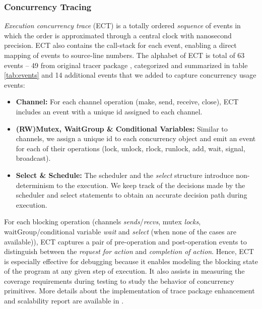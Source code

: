 \subsubsection{Concurrency Tracing}
\textit{Execution concurrency trace} (ECT) is a totally ordered \textit{sequence} of events in which the order is approximated through a central clock with nanosecond precision.
%
ECT also contains the call-stack for each event, enabling a direct mapping of events to source-line numbers.
%
The alphabet of ECT is total of 63 events -- 49 from original tracer package \cite{goParserSource}, categorized and summarized in table \ref{tab:events} and 14 additional events that we added to capture concurrency usage events:
%
\begin{itemize}
    \item \textbf{Channel:} For each channel operation (make, send, receive, close), ECT includes an event with a unique id assigned to each channel.
    \item \textbf{(RW)Mutex, WaitGroup \& Conditional Variables:} Similar to channels, we assign a unique id to each concurrency object and emit an event for each of their operations (lock, unlock, rlock, runlock, add, wait, signal, broadcast).
    \item \textbf{Select \& Schedule:} The scheduler and the \textit{select} structure introduce non-determinism to the execution. We keep track of the decisions made by the scheduler and select statements to obtain an accurate decision path during execution.
\end{itemize}



%
For each blocking operation (channels \textit{sends}/\textit{recvs}, mutex \textit{locks}, waitGroup/conditional variable \textit{wait} and \textit{select} (when none of the cases are available)), ECT captures a pair of pre-operation and post-operation events to distinguish between the \textit{request for action} and \textit{completion of action}.
%
Hence, ECT is especially effective for debugging because it enables modeling the blocking state of the program at any given step of execution.
%
It also assists in measuring the coverage requirements during testing to study the behavior of concurrency primitives.
%
More details about the implementation of trace package enhancement and scalability report are available in \cite{ect-arxiv}.

